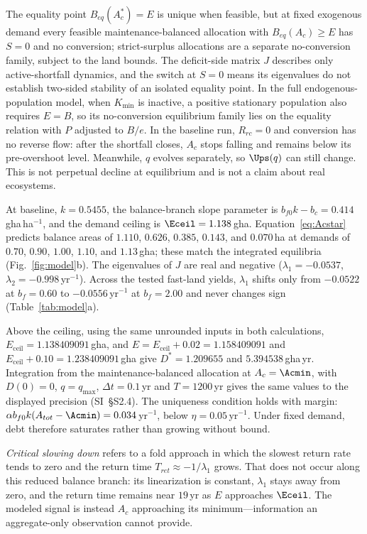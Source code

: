 The equality point $B_{eq}(A_c^*)=E$ is unique when feasible, but at fixed exogenous demand every feasible maintenance-balanced allocation with $B_{eq}(A_c)\ge E$ has $S=0$ and no conversion; strict-surplus allocations are a separate no-conversion family, subject to the land bounds. The deficit-side matrix $J$ describes only active-shortfall dynamics, and the switch at $S=0$ means its eigenvalues do not establish two-sided stability of an isolated equality point. In the full endogenous-population model, when $K_{\min}$ is inactive, a positive stationary population also requires $E=B$, so its no-conversion equilibrium family lies on the equality relation with $P$ adjusted to $B/e$. In the baseline run, $R_{rc}=0$ and conversion has no reverse flow: after the shortfall closes, $A_c$ stops falling and remains below its pre-overshoot level. Meanwhile, $q$ evolves separately, so $\Ups(q)$ can still change. This is not perpetual decline at equilibrium and is not a claim about real ecosystems.

At baseline, $k=0.5455$, the balance-branch slope parameter is $b_{f0}k-b_c=0.414$\,gha\,ha$^{-1}$, and the demand ceiling is $\Eceil=1.138$\,gha. Equation~\eqref{eq:Acstar} predicts balance areas of $1.110$, $0.626$, $0.385$, $0.143$, and $0.070$\,ha at demands of $0.70$, $0.90$, $1.00$, $1.10$, and $1.13$\,gha; these match the integrated equilibria (Fig.~\ref{fig:model}b). The eigenvalues of $J$ are real and negative ($\lambda_1=-0.0537$, $\lambda_2=-0.998$\,yr$^{-1}$). Across the tested fast-land yields, $\lambda_1$ shifts only from $-0.0522$ at $b_f=0.60$ to $-0.0556$\,yr$^{-1}$ at $b_f=2.00$ and never changes sign (Table~\ref{tab:model}a).

Above the ceiling, using the same unrounded inputs in both calculations, $E_{\mathrm{ceil}}=1.138409091$\,gha, and $E=E_{\mathrm{ceil}}+0.02=1.158409091$ and $E_{\mathrm{ceil}}+0.10=1.238409091$\,gha give $D^*=1.209655$ and $5.394538$\,gha\,yr. Integration from the maintenance-balanced allocation at $A_c=\Acmin$, with $D(0)=0$, $q=q_{\max}$, $\Delta t=0.1$\,yr and $T=1200$\,yr gives the same values to the displayed precision (SI~\S S2.4). The uniqueness condition holds with margin: $\alpha b_{f0}k(A_{tot}-\Acmin)=0.034$\,yr$^{-1}$, below $\eta=0.05$\,yr$^{-1}$. Under fixed demand, debt therefore saturates rather than growing without bound.

\emph{Critical slowing down} refers to a fold approach in which the slowest return rate tends to zero and the return time $T_{ret}\approx-1/\lambda_1$ grows. That does not occur along this reduced balance branch: its linearization is constant, $\lambda_1$ stays away from zero, and the return time remains near $19$\,yr as $E$ approaches $\Eceil$. The modeled signal is instead $A_c$ approaching its minimum—information an aggregate-only observation cannot provide.

